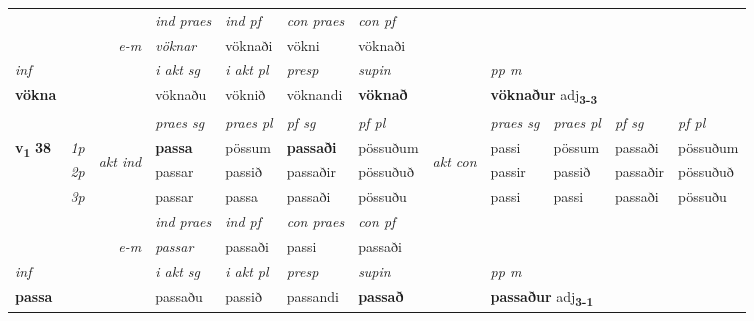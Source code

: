 \begin{longtable}[l]{X>{\footnotesize\itshape}llXXXXlXXXX}
   && &  \textit{ind praes} & \textit{ind pf} & \textit{con praes} & \textit{con pf} \\*
\multicolumn{3}{r}{\textit{e-m}} & vöknar & vöknaði & vökni & vöknaði \\*

\cmidrule{4-7}
   {\textit{inf}} & &  & \textit{i akt sg} & \textit{i akt pl}   & \textit{presp} & \textit{supin}  && \textit{pp m} \\*
  {\textbf{vökna}} & && vöknaðu  & vöknið   & vöknandi &  \textbf{vöknað}  && \multicolumn{2}{l}{\textbf{vöknaður} adj\textbf{\textsubscript{3-3}}} \\*

\midrule

 & &   & \textit{praes sg}  & \textit{praes pl}    & \textit{ pf sg} & \textit{pf pl} & & \textit{praes sg}  & \textit{praes pl}    & \textit{pf sg} & \textit{pf pl }  \\ \cmidrule{4-7} \cmidrule{9-12}
 \multirow{2}{*}{{{\textbf{v{\textsubscript{1}}} \Large{\textbf{38}}}}}  & 1p & \multirow{3}{*}{\begin{turn}{90}\textit{akt ind}\end{turn}} & \textbf{passa} & pössum & \textbf{passaði} & pössuðum & \multirow{3}{*}{\begin{turn}{90}\textit{akt con}\end{turn}} &passi & pössum & passaði & pössuðum\\*
 & 2p &  &  passar  & passið & passaðir & pössuðuð & & passir & passið & passaðir & pössuðuð \\*
 & 3p &  & passar & passa & passaði & pössuðu & & passi & passi& passaði & pössuðu \\*
\cmidrule{4-7} \cmidrule{9-12}

   && &  \textit{ind praes} & \textit{ind pf} & \textit{con praes} & \textit{con pf} \\*
\multicolumn{3}{r}{\textit{e-m}} & passar & passaði & passi & passaði \\*

\cmidrule{4-7}
   {\textit{inf}} & &  & \textit{i akt sg} & \textit{i akt pl}   & \textit{presp} & \textit{supin}  && \textit{pp m} \\*
  {\textbf{passa}} & && passaðu  & passið   & passandi &  \textbf{passað}  && \multicolumn{2}{l}{\textbf{passaður} adj\textbf{\textsubscript{3-1}}} \\*

\midrule


\end{longtable}
